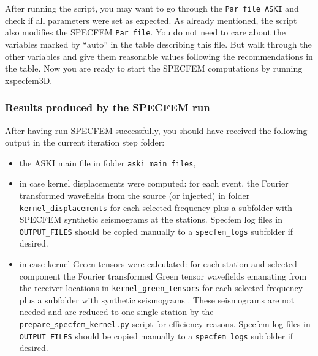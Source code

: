 After running the script, you may want to go through the \verb+Par_file_ASKI+ and check if all parameters were set as expected.
As already mentioned, the script also modifies the SPECFEM \verb+Par_file+. You do not need to care about the variables marked by ``auto'' in the table describing this file. But walk through the other variables and give them reasonable values following the recommendations in the table. Now you are ready to start the SPECFEM computations by running xspecfem3D.
%
\subsubsection{Results produced by the SPECFEM run}
%
After having run SPECFEM successfully, you should have received the following output in the current iteration step folder:
\begin{itemize}
	\setlength{\itemsep}{-0.1cm}
	\item the ASKI main file in folder \verb+aski_main_files+,
	\item in case kernel displacements were computed: for each event, the Fourier transformed wavefields from the source (or injected) in folder \verb+kernel_displacements+ for each selected frequency plus a subfolder with SPECFEM  synthetic seismograms at the stations. Specfem log files in \verb+OUTPUT_FILES+ should be copied manually to a \verb+specfem_logs+ subfolder if desired.
	\item in case kernel Green tensors were calculated: for each station and selected component the Fourier transformed Green tensor wavefields emanating from the receiver locations in \verb+kernel_green_tensors+ for each selected frequency plus a subfolder with synthetic seismograms . These seismograms are not needed and are reduced to one single station by the \verb+prepare_specfem_kernel.py+-script for efficiency reasons.  Specfem log files in \verb+OUTPUT_FILES+ should be copied manually to a \verb+specfem_logs+ subfolder if desired.
\end{itemize}
%
